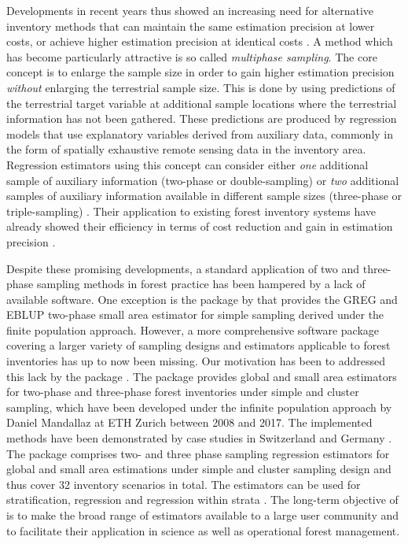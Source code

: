 \documentclass[article]{jss}
\begin{document}
Developments in recent years thus showed an increasing need for alternative inventory methods that can maintain the same estimation precision at lower costs, or achieve higher estimation precision at identical costs \citep{vonluepke2013}. A method which has become particularly attractive is so called \textit{multiphase sampling}. The core concept is to enlarge the sample size in order to gain higher estimation precision \textit{without} enlarging the terrestrial sample size. This is done by using predictions of the terrestrial target variable at additional sample locations where the terrestrial information has not been gathered. These predictions are produced by regression models that use explanatory variables derived from auxiliary data, commonly in the form of spatially exhaustive remote sensing data in the inventory area. Regression estimators using this concept can consider either \textit{one} additional sample of auxiliary information (two-phase or double-sampling) or \textit{two} additional samples of auxiliary information available in different sample sizes (three-phase or triple-sampling) \citep{gregoire2007, saborowski2010, mandallaz2013a, mandallaz2013c, vonLüpke2012}. Their application to existing forest inventory systems have already showed their efficiency in terms of cost reduction and gain in estimation precision \citep{breidenbach2012, vonLuebke2014, mandallaz2013b, magnussen2014, massey2014a}.\par

Despite these promising developments, a standard application of two and three-phase sampling methods in forest practice has been hampered by a lack of available software. One exception is the  package  by \citet{josae2015} that provides the GREG \citep{sarndal2003} and EBLUP \citep{battese1988} two-phase small area estimator for simple sampling derived under the finite population approach. However, a more comprehensive software package covering a larger variety of sampling designs and estimators applicable to forest inventories has up to now been missing. Our motivation has been to addressed this lack by the  package . The package provides global and small area estimators for two-phase and three-phase forest inventories under simple and cluster sampling, which have been developed under the infinite population approach by Daniel Mandallaz at ETH Zurich between 2008 and 2017. The implemented methods have been demonstrated by case studies in Switzerland \citep{massey2014a, massey2015b, mandallaz2013b} and Germany \citep{hill2017a}. The package comprises two- and three phase sampling regression estimators for global and small area estimations under simple and cluster sampling design and thus cover 32 inventory scenarios in total. The estimators can be used for stratification, regression and regression within strata \citep{massey2015}. The long-term objective of  is to make the broad range of estimators available to a large user community and to facilitate their application in science as well as operational forest management.
\end{document}

